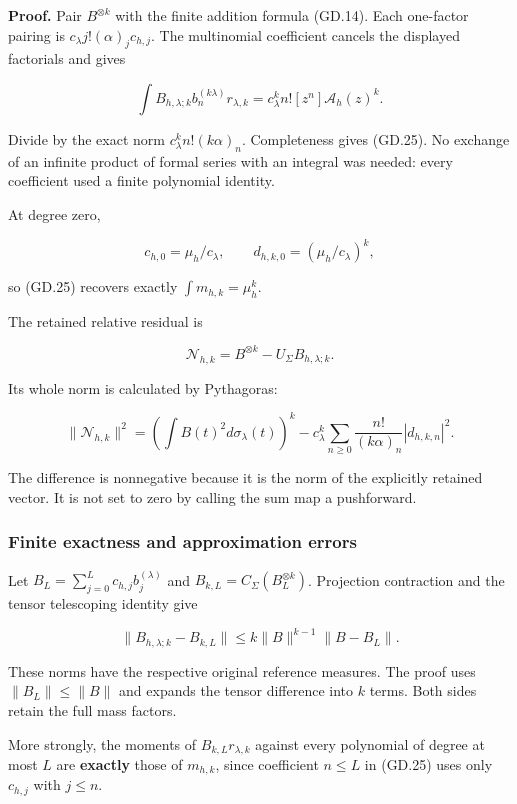 \textbf{Proof.} Pair \(B^{\otimes k}\) with the finite addition formula
(GD.14). Each one-factor pairing is \(c_\lambda j!(\alpha)_j c_{h,j}\). The
multinomial coefficient cancels the displayed factorials and gives

\[
\int B_{h,\lambda;k} b_n^{(k\lambda)}r_{\lambda,k}
=c_\lambda^k n! [z^n]\mathcal A_h(z)^k.
\]

Divide by the exact norm \(c_\lambda^k n!(k\alpha)_n\). Completeness
gives (GD.25). No exchange of an infinite product of formal series with an
integral was needed: every coefficient used a finite polynomial
identity.

At degree zero,

\[
c_{h,0}=\mu_h/c_\lambda,\qquad
 d_{h,k,0}=(\mu_h/c_\lambda)^k,
\]

so (GD.25) recovers exactly \(\int m_{h,k}=\mu_h^k\).

The retained relative residual is

\[
\mathcal N_{h,k}=B^{\otimes k}-U_\Sigma B_{h,\lambda;k}.
\]

Its whole norm is calculated by Pythagoras:

\[
\boxed{
\|\mathcal N_{h,k}\|^2
=\left(\int B(t)^2d\sigma_\lambda(t)\right)^k
-c_\lambda^k\sum_{n\ge0}\frac{n!}{(k\alpha)_n}|d_{h,k,n}|^2.
}                                                                   \tag{GD.26}
\]

The difference is nonnegative because it is the norm of the explicitly
retained vector. It is not set to zero by calling the sum map a
pushforward.

\subsubsection{Finite exactness and approximation
errors}\label{gammad-finite-exactness-and-approximation-errors}

Let \(B_L=\sum_{j=0}^L c_{h,j}b_j^{(\lambda)}\) and
\(B_{k,L}=C_\Sigma(B_L^{\otimes k})\). Projection contraction and the
tensor telescoping identity give

\[
\boxed{
\|B_{h,\lambda;k}-B_{k,L}\|
\le k\|B\|^{k-1}\|B-B_L\|.
}                                                                   \tag{GD.27}
\]

These norms have the respective original reference measures. The proof
uses \(\|B_L\|\le\|B\|\) and expands the tensor difference into \(k\)
terms. Both sides retain the full mass factors.

More strongly, the moments of \(B_{k,L}r_{\lambda,k}\) against every
polynomial of degree at most \(L\) are \textbf{exactly} those of
\(m_{h,k}\), since coefficient \(n\le L\) in (GD.25) uses only \(c_{h,j}\)
with \(j\le n\).

